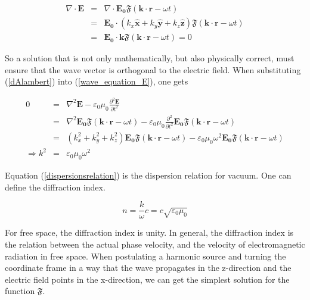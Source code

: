 \documentclass[a4paper,14pt]{extbook}
\begin{document}
\begin{eqnarray}
    \nabla \cdot \mathbf{E}&=& \nabla \cdot \mathbf{E_0}\mathfrak{F}(\mathbf{k}\cdot \mathbf{r}-\omega t)\\
&=& \mathbf{E_0} \cdot (k_x\mathbf{\hat{x}} + k_y\mathbf{\hat{y}}  + k_z \mathbf{\hat{z}} ) \mathfrak{F}(\mathbf{k}\cdot \mathbf{r}-\omega t) \nonumber \\
&=& \mathbf{E_0} \cdot \mathbf{k} \mathfrak{F}(\mathbf{k}\cdot \mathbf{r}-\omega t) = 0\nonumber
\end{eqnarray}


So a solution that is not only mathematically, but also physically correct, must ensure that the wave vector is orthogonal to the electric field. When substituting (\ref{dAlambert}) into (\ref{wave_equation_E}), one gets

\begin{eqnarray}
0&=& \nabla^2 \mathbf{E}-\varepsilon_0 \mu_0 \frac{\partial^2 \mathbf{E}}{\partial t^2}\\
&=& \nabla^2 \mathbf{E_0}\mathfrak{F}(\mathbf{k}\cdot \mathbf{r}-\omega t)-\varepsilon_0 \mu_0 \frac{\partial^2 }{\partial t^2} \mathbf{E_0}\mathfrak{F}(\mathbf{k}\cdot \mathbf{r}-\omega t)\nonumber
\\
&=& (k_x^2 + k_y^2 + k_z^2) \mathbf{E_0} \mathfrak{F}(\mathbf{k}\cdot \mathbf{r}-\omega t)-\varepsilon_0 \mu_0  \omega^2 \mathbf{E_0}\mathfrak{F}(\mathbf{k}\cdot \mathbf{r}-\omega t)\nonumber
\\
\Rightarrow k^2 &=& \varepsilon_0 \mu_0  \omega^2 \label{dispersionsrelation}
\end{eqnarray}

Equation (\ref{dispersionsrelation}) is the dispersion relation for vacuum. One can define the diffraction index.

\begin{equation}\label{brechungsindex}
    n=\frac{k}{\omega}c= c\sqrt{\varepsilon_0 \mu_0}
\end{equation}

For free space, the diffraction index is unity. In general, the diffraction index is the relation between the actual phase velocity, and the velocity of electromagnetic radiation in free space. When postulating a harmonic source and turning the coordinate frame in a way that the wave propagates in the z-direction and the electric field points in the x-direction, we can get the simplest solution for the function $\mathfrak{F}$.
\end{document}
